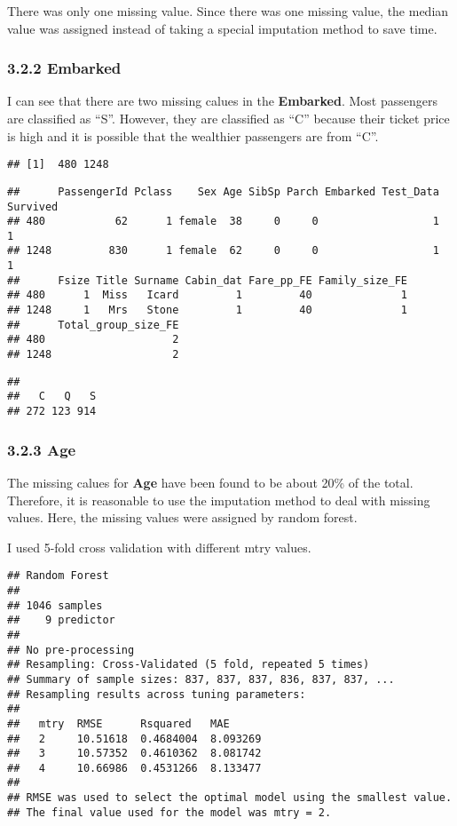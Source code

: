 \documentclass[
]{article}
\begin{document}
There was only one missing value. Since there was one missing value, the
median value was assigned instead of taking a special imputation method
to save time.

\hypertarget{embarked-1}{%
\subsubsection{\texorpdfstring{\textbf{3.2.2
Embarked}}{3.2.2 Embarked}}\label{embarked-1}}

I can see that there are two missing calues in the \textbf{Embarked}.
Most passengers are classified as ``S''. However, they are classified as
``C'' because their ticket price is high and it is possible that the
wealthier passengers are from ``C''.

\begin{verbatim}
## [1]  480 1248
\end{verbatim}

\begin{verbatim}
##      PassengerId Pclass    Sex Age SibSp Parch Embarked Test_Data Survived
## 480           62      1 female  38     0     0                  1        1
## 1248         830      1 female  62     0     0                  1        1
##      Fsize Title Surname Cabin_dat Fare_pp_FE Family_size_FE
## 480      1  Miss   Icard         1         40              1
## 1248     1   Mrs   Stone         1         40              1
##      Total_group_size_FE
## 480                    2
## 1248                   2
\end{verbatim}

\begin{verbatim}
## 
##   C   Q   S 
## 272 123 914
\end{verbatim}

\hypertarget{age-1}{%
\subsubsection{\texorpdfstring{\textbf{3.2.3
Age}}{3.2.3 Age}}\label{age-1}}

The missing calues for \textbf{Age} have been found to be about 20\% of
the total. Therefore, it is reasonable to use the imputation method to
deal with missing values. Here, the missing values were assigned by
random forest.

I used 5-fold cross validation with different mtry values.

\begin{verbatim}
## Random Forest 
## 
## 1046 samples
##    9 predictor
## 
## No pre-processing
## Resampling: Cross-Validated (5 fold, repeated 5 times) 
## Summary of sample sizes: 837, 837, 837, 836, 837, 837, ... 
## Resampling results across tuning parameters:
## 
##   mtry  RMSE      Rsquared   MAE     
##   2     10.51618  0.4684004  8.093269
##   3     10.57352  0.4610362  8.081742
##   4     10.66986  0.4531266  8.133477
## 
## RMSE was used to select the optimal model using the smallest value.
## The final value used for the model was mtry = 2.
\end{verbatim}
\end{document}
